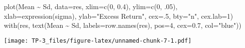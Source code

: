 \documentclass[
]{article}
\newenvironment{Shaded}{\begin{snugshade}}{\end{snugshade}}
\newcommand{\AttributeTok}[1]{\textcolor[rgb]{0.77,0.63,0.00}{#1}}
\newcommand{\ControlFlowTok}[1]{\textcolor[rgb]{0.13,0.29,0.53}{\textbf{#1}}}
\newcommand{\DecValTok}[1]{\textcolor[rgb]{0.00,0.00,0.81}{#1}}
\newcommand{\FloatTok}[1]{\textcolor[rgb]{0.00,0.00,0.81}{#1}}
\newcommand{\FunctionTok}[1]{\textcolor[rgb]{0.00,0.00,0.00}{#1}}
\newcommand{\NormalTok}[1]{#1}
\newcommand{\OtherTok}[1]{\textcolor[rgb]{0.56,0.35,0.01}{#1}}
\newcommand{\SpecialCharTok}[1]{\textcolor[rgb]{0.00,0.00,0.00}{#1}}
\newcommand{\StringTok}[1]{\textcolor[rgb]{0.31,0.60,0.02}{#1}}
\begin{document}
\begin{Shaded}
\end{Shaded}

\begin{Shaded}
\begin{Highlighting}[]
\FunctionTok{plot}\NormalTok{(Mean }\SpecialCharTok{\textasciitilde{}}\NormalTok{ Sd, }\AttributeTok{data=}\NormalTok{res, }\AttributeTok{xlim=}\FunctionTok{c}\NormalTok{(}\DecValTok{0}\NormalTok{, }\FloatTok{0.4}\NormalTok{), }\AttributeTok{ylim=}\FunctionTok{c}\NormalTok{(}\DecValTok{0}\NormalTok{, .}\DecValTok{05}\NormalTok{), }\AttributeTok{xlab=}\FunctionTok{expression}\NormalTok{(sigma),}
     \AttributeTok{ylab=}\StringTok{"Excess Return"}\NormalTok{, }\AttributeTok{cex=}\NormalTok{.}\DecValTok{5}\NormalTok{, }\AttributeTok{bty=}\StringTok{"n"}\NormalTok{, }\AttributeTok{cex.lab=}\DecValTok{1}\NormalTok{)}
\FunctionTok{with}\NormalTok{(res, }\FunctionTok{text}\NormalTok{(Mean }\SpecialCharTok{\textasciitilde{}}\NormalTok{ Sd, }\AttributeTok{labels=}\FunctionTok{row.names}\NormalTok{(res), }\AttributeTok{pos=}\DecValTok{4}\NormalTok{, }\AttributeTok{cex=}\FloatTok{0.7}\NormalTok{, }\AttributeTok{col=}\StringTok{"blue"}\NormalTok{))}
\end{Highlighting}
\end{Shaded}

\texttt{[image: TP-3\_files/figure-latex/unnamed-chunk-7-1.pdf]}
\end{document}
